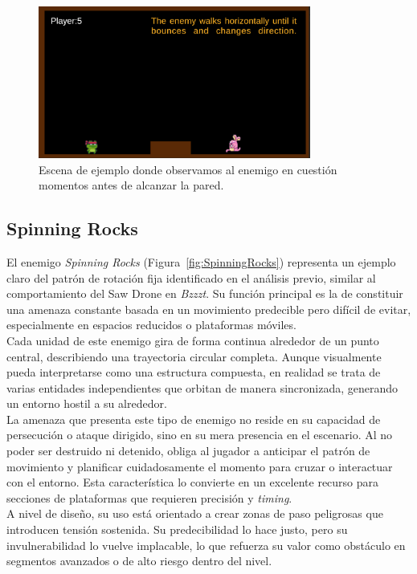 \begin{figure}[t]
	\centering
	\includegraphics[height=5cm]{Imagenes/BouncingBunny.png}
	\caption{Escena de ejemplo donde observamos al enemigo en cuestión momentos antes de alcanzar la pared.}
	\label{fig:BouncingBunny}
\end{figure}

\subsection{Spinning Rocks}

El enemigo \textit{Spinning Rocks} (Figura~\ref{fig:SpinningRocks}) representa un ejemplo claro del patrón de rotación fija identificado en el análisis previo, similar al comportamiento del Saw Drone en \textit{Bzzzt}. Su función principal es la de constituir una amenaza constante basada en un movimiento predecible pero difícil de evitar, especialmente en espacios reducidos o plataformas móviles.\\

Cada unidad de este enemigo gira de forma continua alrededor de un punto central, describiendo una trayectoria circular completa. Aunque visualmente pueda interpretarse como una estructura compuesta, en realidad se trata de varias entidades independientes que orbitan de manera sincronizada, generando un entorno hostil a su alrededor.\\

La amenaza que presenta este tipo de enemigo no reside en su capacidad de persecución o ataque dirigido, sino en su mera presencia en el escenario. Al no poder ser destruido ni detenido, obliga al jugador a anticipar el patrón de movimiento y planificar cuidadosamente el momento para cruzar o interactuar con el entorno. Esta característica lo convierte en un excelente recurso para secciones de plataformas que requieren precisión y \textit{timing}.\\

A nivel de diseño, su uso está orientado a crear zonas de paso peligrosas que introducen tensión sostenida. Su predecibilidad lo hace justo, pero su invulnerabilidad lo vuelve implacable, lo que refuerza su valor como obstáculo en segmentos avanzados o de alto riesgo dentro del nivel.

